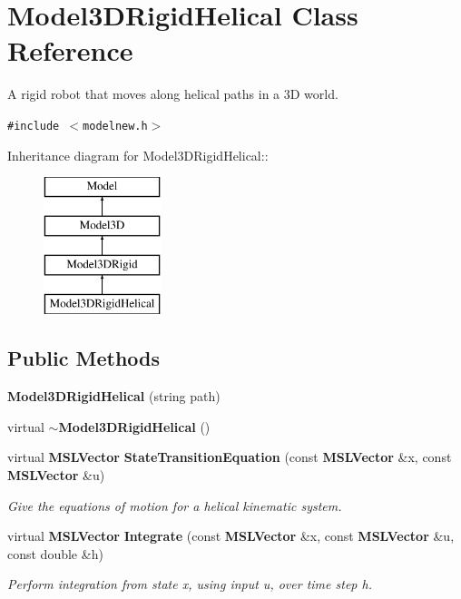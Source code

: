 \section{Model3DRigid\-Helical  Class Reference}
\label{classModel3DRigidHelical}
A rigid robot that moves along helical paths in a 3D world. 


{\tt \#include $<$modelnew.h$>$}

Inheritance diagram for Model3DRigid\-Helical::\begin{figure}[H]
\begin{center}
\leavevmode
\includegraphics[height=4cm]{classModel3DRigidHelical}
\end{center}
\end{figure}
\subsection*{Public Methods}
\begin{CompactItemize}
\item 
{\bf Model3DRigid\-Helical} (string path)
\item 
virtual {\bf $\sim$Model3DRigid\-Helical} ()
\item 
virtual {\bf MSLVector} {\bf State\-Transition\-Equation} (const {\bf MSLVector} \&x, const {\bf MSLVector} \&u)
\begin{CompactList}\small\item\em Give the equations of motion for a helical kinematic system.\item\end{CompactList}\item 
virtual {\bf MSLVector} {\bf Integrate} (const {\bf MSLVector} \&x, const {\bf MSLVector} \&u, const double \&h)
\begin{CompactList}\small\item\em Perform integration from state x, using input u, over time step h.\item\end{CompactList}\end{CompactItemize}


